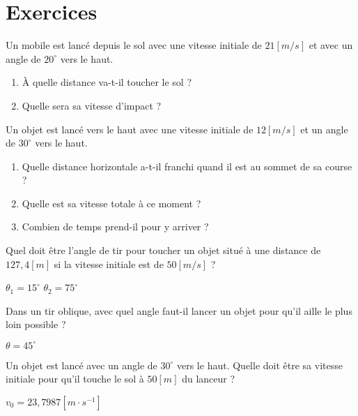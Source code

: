 \newpage

\section{Exercices}
\begin{exercise}
    Un mobile est lancé depuis le sol avec une vitesse initiale de \(21\unit{[m/s]}\) et avec un angle de \(20^{\circ}\) vers le haut.
    \begin{enumerate}[label=\alph*)]
        \item À quelle distance va-t-il toucher le sol ?
        \item Quelle sera sa vitesse d'impact ?
    \end{enumerate}
\end{exercise}

\begin{exercise}
    Un objet est lancé vers le haut avec une vitesse initiale de \(12\unit{[m/s]}\) et un angle de \(30^{\circ}\) vers le haut.
    \begin{enumerate}
        \item Quelle distance horizontale a-t-il franchi quand il est au sommet de sa course ?
        \item Quelle est sa vitesse totale à ce moment ?
        \item Combien de temps prend-il pour y arriver ?
    \end{enumerate}
\end{exercise}


\begin{exercise}
    Quel doit être l'angle de tir pour toucher un objet situé à une distance de \(127,4[m]\) si la vitesse initiale est de \(50\unit{[m/s]}\) ?
\end{exercise}
\begin{solution}
    \(\theta_1=15^{\circ}\)
    \(\theta_2=75^{\circ}\)
\end{solution}


\begin{exercise}
    Dans un tir oblique, avec quel angle faut-il lancer un objet pour qu'il aille le plus loin possible ?
\end{exercise}
\begin{solution}
    \(\theta=45^{\circ}\)
\end{solution}


\begin{exercise}
    Un objet est lancé avec un angle de \(30^{\circ}\) vers le haut. Quelle doit être sa vitesse initiale pour qu'il touche le sol à \(50[m]\) du lanceur ?
\end{exercise}
\begin{solution}
    \(v_0=23,7987[m \cdot s^{-1}]\)
\end{solution}


